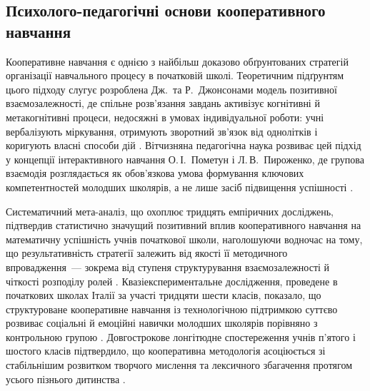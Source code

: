 \documentclass[a4paper,14pt]{extarticle}
\begin{document}
\subsection{Психолого-педагогічні основи кооперативного навчання}

Кооперативне навчання є однією з найбільш доказово обґрунтованих стратегій організації навчального процесу в початковій школі. Теоретичним підґрунтям цього підходу слугує розроблена Дж.~та Р.~Джонсонами модель позитивної взаємозалежності, де спільне розв'язання завдань активізує когнітивні й метакогнітивні процеси, недосяжні в умовах індивідуальної роботи: учні вербалізують міркування, отримують зворотний зв'язок від однолітків і коригують власні способи дій \parencite{Gu2015143}. Вітчизняна педагогічна наука розвиває цей підхід у концепції інтерактивного навчання О.\,І.~Пометун і Л.\,В.~Пироженко, де групова взаємодія розглядається як обов'язкова умова формування ключових компетентностей молодших школярів, а не лише засіб підвищення успішності \parencite{Pometun2004}.

Систематичний мета-аналіз, що охоплює тридцять емпіричних досліджень, підтвердив статистично значущий позитивний вплив кооперативного навчання на математичну успішність учнів початкової школи, наголошуючи водночас на тому, що результативність стратегії залежить від якості її методичного впровадження~--- зокрема від ступеня структурування взаємозалежності й чіткості розподілу ролей \parencite{Talkhan2025}. Квазіекспериментальне дослідження, проведене в початкових школах Італії за участі тридцяти шести класів, показало, що структуроване кооперативне навчання із технологічною підтримкою суттєво розвиває соціальні й емоційні навички молодших школярів порівняно з контрольною групою \parencite{Zagni2025}. Довгострокове лонгітюдне спостереження учнів п'ятого і шостого класів підтвердило, що кооперативна методологія асоціюється зі стабільнішим розвитком творчого мислення та лексичного збагачення протягом усього пізнього дитинства \parencite{Segundo-Marcos2025}.
\end{document}
